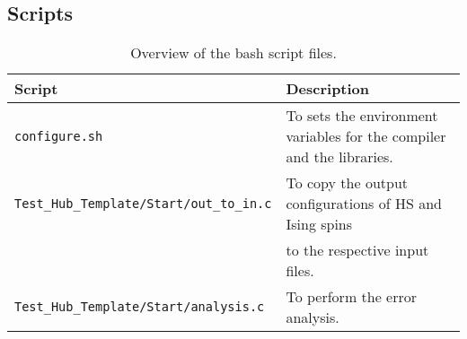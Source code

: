 \subsection{Scripts}\label{sec:scripts}
%
\begin{table}[h]
   \begin{tabular}{l l}
   Script & Description \\\hline
   \texttt{configure.sh} & To sets the environment variables for the compiler and the libraries.\\
   \texttt{Test\_Hub\_Template/Start/out\_to\_in.c} & To copy the output configurations of HS and Ising spins\\
   & to the respective input files. \\
   \texttt{Test\_Hub\_Template/Start/analysis.c} & To perform the error analysis.
   \end{tabular}
   \caption{Overview of the bash script files. \label{table:scripts}}
\end{table}
%
